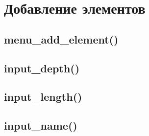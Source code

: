 \documentclass[12pt, a4paper]{article}
\begin{document}





\section{Добавление элементов}


\subsection{menu\_add\_element()}






\subsection{input\_depth()}






\subsection{input\_length()}






\subsection{input\_name()}
\end{document}
